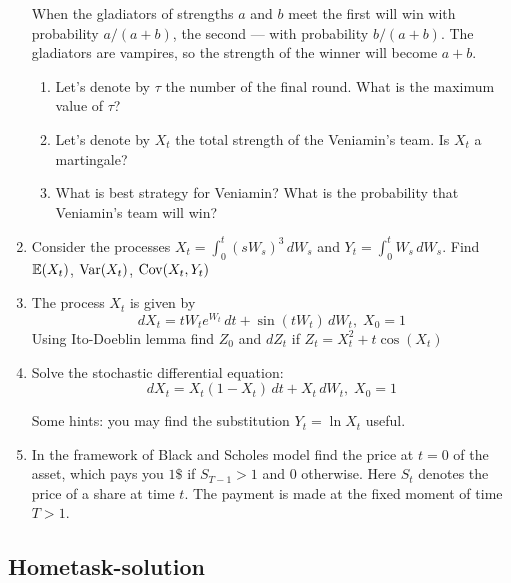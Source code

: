 \documentclass[12pt, a4paper]{article}
\begin{document}
\begin{enumerate}
When the gladiators of strengths $a$ and $b$ meet the first will win with probability $a/(a+b)$, the second — with probability $b/(a+b)$. The gladiators are vampires, so the strength of the winner will become $a+b$.

\begin{enumerate}
\item Let's denote by $\tau$ the number of the final round. What is the maximum value of $\tau$?
\item Let's denote by $X_t$ the total strength of the Veniamin's team. Is $X_t$ a martingale?
\item What is best strategy for Veniamin? What is the probability that Veniamin's team will win?
\end{enumerate}


\item Consider the processes $X_t=\int_0^t (s W_s)^3 \,dW_s$ and $Y_t=\int_0^t W_s \, dW_s$. Find $\operatorname{\mathbb{E}}(X_t)$, $\operatorname{Var}(X_t)$, $\operatorname{Cov}(X_t,Y_t)$

\item The process $X_t$ is given by
\[
dX_t=tW_t e^{W_t} \, dt + \sin (tW_t) \, dW_t, \; X_0=1
\]
Using Ito-Doeblin lemma find $Z_0$ and $dZ_t$ if $Z_t=X_t^2+t\cos (X_t)$

\item Solve the stochastic differential equation:
\[
dX_t=X_t(1-X_t) \, dt+X_t \, dW_t, \; X_0=1
\]

Some hints: you may find the substitution $Y_t = \ln X_t$ useful.

\item In the framework of Black and Scholes model find the price at $t=0$ of the asset, which pays you $1 \$ $  if $S_{T-1}>1$ and $0$ otherwise. Here $S_t$ denotes the price of a share at time $t$. The payment is made at the fixed moment of time $T >1$.

\end{enumerate}


\subsection{Hometask-solution}
\end{document}
